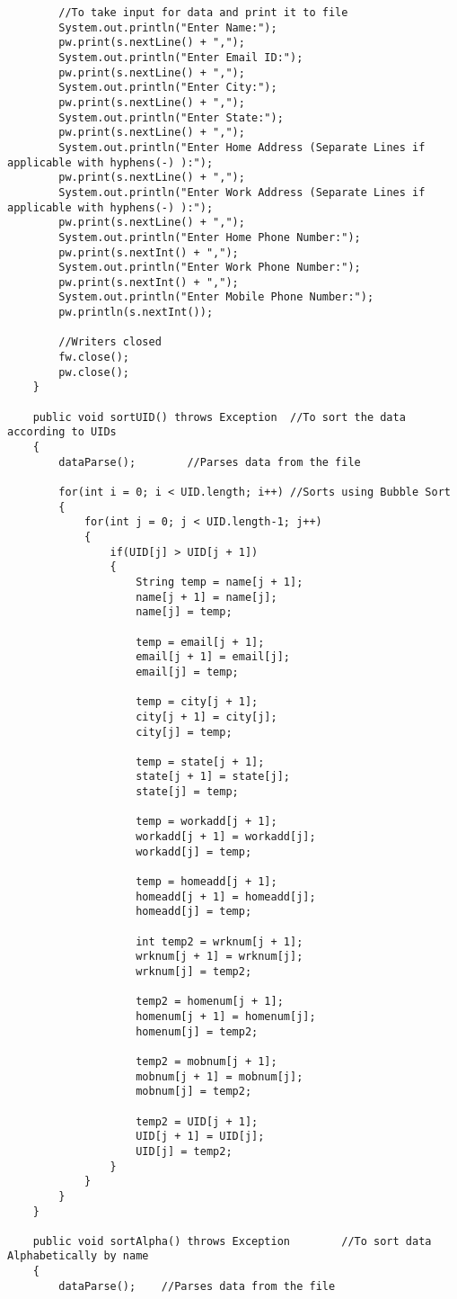\documentclass[ProgramminAssignment.tex]{subfiles}
\begin{document}
\begin{lstlisting}
		//To take input for data and print it to file
		System.out.println("Enter Name:");
		pw.print(s.nextLine() + ",");
		System.out.println("Enter Email ID:");
		pw.print(s.nextLine() + ",");
		System.out.println("Enter City:");
		pw.print(s.nextLine() + ",");
		System.out.println("Enter State:");
		pw.print(s.nextLine() + ",");
		System.out.println("Enter Home Address (Separate Lines if applicable with hyphens(-) ):");
		pw.print(s.nextLine() + ",");
		System.out.println("Enter Work Address (Separate Lines if applicable with hyphens(-) ):");
		pw.print(s.nextLine() + ",");
		System.out.println("Enter Home Phone Number:");
		pw.print(s.nextInt() + ",");
		System.out.println("Enter Work Phone Number:");
		pw.print(s.nextInt() + ",");
		System.out.println("Enter Mobile Phone Number:");
		pw.println(s.nextInt());
		
		//Writers closed
		fw.close();
		pw.close();
	}
	
	public void sortUID() throws Exception	//To sort the data according to UIDs
	{
		dataParse();		//Parses data from the file
		
		for(int i = 0; i < UID.length; i++)	//Sorts using Bubble Sort
		{
			for(int j = 0; j < UID.length-1; j++)
			{
				if(UID[j] > UID[j + 1]) 
				{
					String temp = name[j + 1];
					name[j + 1] = name[j];
					name[j] = temp;
					
					temp = email[j + 1];
					email[j + 1] = email[j];
					email[j] = temp;
				
					temp = city[j + 1];
					city[j + 1] = city[j];
					city[j] = temp;
					
					temp = state[j + 1];
					state[j + 1] = state[j];
					state[j] = temp;
					
					temp = workadd[j + 1];
					workadd[j + 1] = workadd[j];
					workadd[j] = temp;
					
					temp = homeadd[j + 1];
					homeadd[j + 1] = homeadd[j];
					homeadd[j] = temp;
					
					int temp2 = wrknum[j + 1];
					wrknum[j + 1] = wrknum[j];
					wrknum[j] = temp2;
					
					temp2 = homenum[j + 1];
					homenum[j + 1] = homenum[j];
					homenum[j] = temp2;
					
					temp2 = mobnum[j + 1];
					mobnum[j + 1] = mobnum[j];
					mobnum[j] = temp2;
					
					temp2 = UID[j + 1];
					UID[j + 1] = UID[j];
					UID[j] = temp2;
				}
			}
		}
	}
	
	public void sortAlpha() throws Exception		//To sort data Alphabetically by name
	{
		dataParse();	//Parses data from the file
		

\end{lstlisting}
\end{document}
